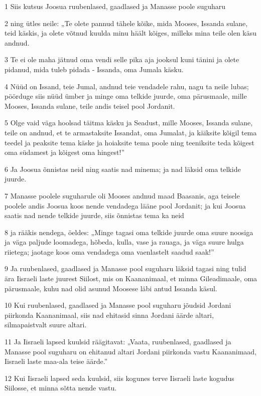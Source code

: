 \par 1 Siis kutsus Joosua ruubenlased, gaadlased ja Manasse poole suguharu
\par 2 ning ütles neile: „Te olete pannud tähele kõike, mida Mooses, Issanda sulane, teid käskis, ja olete võtnud kuulda minu häält kõiges, milleks mina teile olen käsu andnud.
\par 3 Te ei ole maha jätnud oma vendi selle pika aja jooksul kuni tänini ja olete pidanud, mida tuleb pidada - Issanda, oma Jumala käsku.
\par 4 Nüüd on Issand, teie Jumal, andnud teie vendadele rahu, nagu ta neile lubas; pöörduge siis nüüd ümber ja minge oma telkide juurde, oma pärusmaale, mille Mooses, Issanda sulane, teile andis teisel pool Jordanit.
\par 5 Olge vaid väga hoolsad täitma käsku ja Seadust, mille Mooses, Issanda sulane, teile on andnud, et te armastaksite Issandat, oma Jumalat, ja käiksite kõigil tema teedel ja peaksite tema käske ja hoiaksite tema poole ning teeniksite teda kõigest oma südamest ja kõigest oma hingest!”
\par 6 Ja Joosua õnnistas neid ning saatis nad minema; ja nad läksid oma telkide juurde.
\par 7 Manasse poolele suguharule oli Mooses andnud maad Baasanis, aga teisele poolele andis Joosua koos nende vendadega lääne pool Jordanit; ja kui Joosua saatis nad nende telkide juurde, siis õnnistas tema ka neid
\par 8 ja rääkis nendega, öeldes: „Minge tagasi oma telkide juurde oma suure noosiga ja väga paljude loomadega, hõbeda, kulla, vase ja rauaga, ja väga suure hulga riietega; jaotage koos oma vendadega oma vaenlastelt saadud saak!”
\par 9 Ja ruubenlased, gaadlased ja Manasse pool suguharu läksid tagasi ning tulid ära Iisraeli laste juurest Siilost, mis on Kaananimaal, et minna Gileadimaale, oma pärusmaale, kuhu nad olid asunud Moosese läbi antud Issanda käsul.
\par 10 Kui ruubenlased, gaadlased ja Manasse pool suguharu jõudsid Jordani piirkonda Kaananimaal, siis nad ehitasid sinna Jordani äärde altari, silmapaistvalt suure altari.
\par 11 Ja Iisraeli lapsed kuulsid räägitavat: „Vaata, ruubenlased, gaadlased ja Manasse pool suguharu on ehitanud altari Jordani piirkonda vastu Kaananimaad, Iisraeli laste maa-ala teise äärde.”
\par 12 Kui Iisraeli lapsed seda kuulsid, siis kogunes terve Iisraeli laste kogudus Siilosse, et minna sõtta nende vastu.
